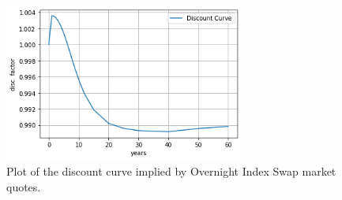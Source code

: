 \begin{figure}[htb]
  \centering
  \includegraphics[width=0.7\textwidth]{figures/bootstrap_23_0.png}
  \caption{Plot of the discount curve implied by Overnight Index Swap market quotes.}
  \label{fig:discount_curve}
\end{figure}

